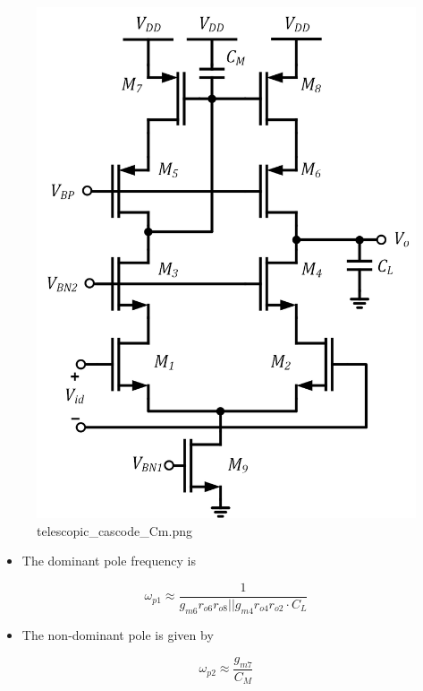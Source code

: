 \documentclass[11pt]{article}
\providecommand{\tightlist}{%
      \setlength{\itemsep}{0pt}\setlength{\parskip}{0pt}}
\begin{document}
    \begin{figure}
\centering
\includegraphics{telescopic_cascode_Cm.png}
\caption{telescopic\_cascode\_Cm.png}
\end{figure}

    \begin{itemize}
\tightlist
\item
  The dominant pole frequency is
\end{itemize}

\begin{equation}
\omega_{p1} \approx \dfrac{1}{g_{m6}r_{o6}r_{o8}||g_{m4}r_{o4}r_{o2} \cdot C_L}
\end{equation}

\begin{itemize}
\tightlist
\item
  The non-dominant pole is given by
\end{itemize}

\begin{equation}
\omega_{p2} \approx \dfrac{g_{m7}}{C_M}
\end{equation}
\end{document}

